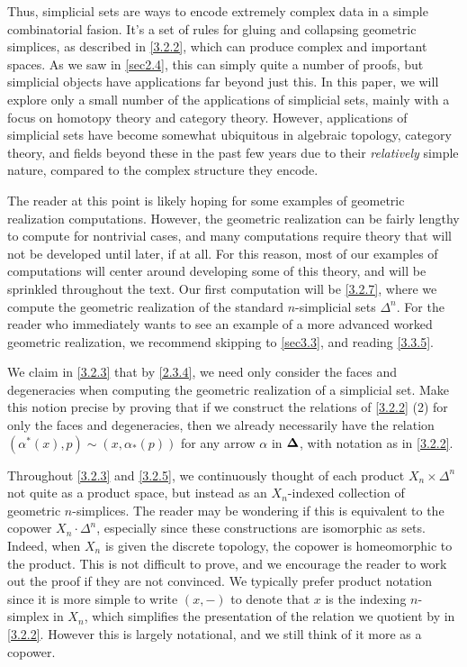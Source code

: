 \begin{intuition}
	Thus, simplicial sets are ways to encode extremely complex data in a simple combinatorial fasion. It's a set of rules for gluing and collapsing geometric simplices, as described in \cref{3.2.2}, which can produce complex and important spaces. As we saw in \cref{sec2.4}, this can simply quite a number of proofs, but simplicial objects have applications far beyond just this. In this paper, we will explore only a small number of the applications of simplicial sets, mainly with a focus on homotopy theory and category theory. However, applications of simplicial sets have become somewhat ubiquitous in algebraic topology, category theory, and fields beyond these in the past few years due to their \emph{relatively} simple nature, compared to the complex structure they encode.

    The reader at this point is likely hoping for some examples of geometric realization computations. However, the geometric realization can be fairly lengthy to compute for nontrivial cases, and many computations require theory that will not be developed until later, if at all. For this reason, most of our examples of computations will center around developing some of this theory, and will be sprinkled throughout the text. Our first computation will be \cref{3.2.7}, where we compute the geometric realization of the standard $n$-simplicial sets $\Delta^n$. For the reader who immediately wants to see an example of a more advanced worked geometric realization, we recommend skipping to \cref{sec3.3}, and reading \cref{3.3.5}.
\end{intuition}

\begin{exercise}\label{3.2.5}
    We claim in \cref{3.2.3} that by \cref{2.3.4}, we need only consider the faces and degeneracies when computing the geometric realization of a simplicial set. Make this notion precise by proving that if we construct the relations of \cref{3.2.2} (2) for only the faces and degeneracies, then we already necessarily have the relation $(\alpha^*(x),p)\sim(x,\alpha_*(p))$ for any arrow $\alpha$ in $\boldsymbol{\Delta}$, with notation as in \cref{3.2.2}.
\end{exercise}

\begin{remark}\label{3.2.6}
    Throughout \cref{3.2.3} and \cref{3.2.5}, we continuously thought of each product $X_n\times\Delta^n$ not quite as a product space, but instead as an $X_n$-indexed collection of geometric $n$-simplices. The reader may be wondering if this is equivalent to the copower $X_n\cdot\Delta^n$, especially since these constructions are isomorphic as sets. Indeed, when $X_n$ is given the discrete topology, the copower is homeomorphic to the product. This is not difficult to prove, and we encourage the reader to work out the proof if they are not convinced. We typically prefer product notation since it is more simple to write $(x,-)$ to denote that $x$ is the indexing $n$-simplex in $X_n$, which simplifies the presentation of the relation we quotient by in \cref{3.2.2}. However this is largely notational, and we still think of it more as a copower.
\end{remark}

